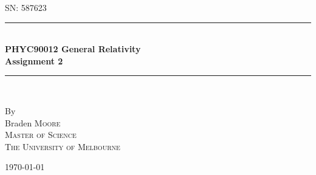 \documentclass[a4paper]{article} %
\begin{document}
\pagestyle{empty}

\newcommand{\HRule}{\rule{\linewidth}{0.5mm}}

\begin{titlepage}

    \begin{center}
        \textsc{\large SN: 587623}\\[6cm]

        \HRule \\[0.5cm]
		\Huge \textbf{PHYC90012 General Relativity}\\[0.5cm]
        \huge \textbf{Assignment 2}\\[0.5cm] 
        \HRule \\[1.5cm]
        \begin{minipage}{0.4\textwidth}
        \begin{center}

        \large By \\[0.75cm]
        \huge Braden \scshape Moore \\[0.5cm]
        \normalsize \normalfont Master of Science \\
        The University of Melbourne \\

        \end{center}
        \end{minipage}

        \vfill

        \large \today
    \end{center}

\newpage
\end{titlepage}
\pagestyle{fancy}
\lfoot{\textsc{\today}}
\setcounter{page}{1}
\setcounter{section}{1}
\end{document}
